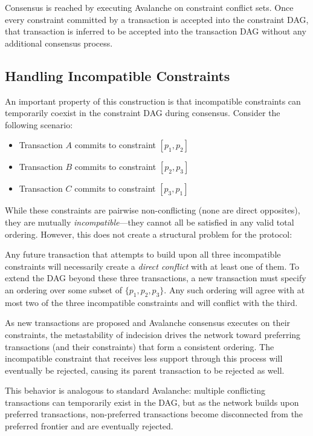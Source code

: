 \documentclass[12pt]{article}
\begin{document}
Consensus is reached by executing Avalanche on constraint conflict sets. Once
every constraint committed by a transaction is accepted into the constraint
DAG, that transaction is inferred to be accepted into the transaction DAG
without any additional consensus process.

\subsection{Handling Incompatible Constraints}
\label{sec:incompatible}
An important property of this construction is that incompatible constraints can
temporarily coexist in the constraint DAG during consensus. Consider the
following scenario:
\begin{itemize}
\item Transaction $A$ commits to constraint $[p_1, p_2]$
\item Transaction $B$ commits to constraint $[p_2, p_3]$
\item Transaction $C$ commits to constraint $[p_3, p_1]$
\end{itemize}

While these constraints are pairwise non-conflicting (none are direct
opposites), they are mutually \emph{incompatible}—they cannot all be satisfied
in any valid total ordering. However, this does not create a structural problem
for the protocol:

Any future transaction that attempts to build upon all three incompatible
constraints will necessarily create a \emph{direct conflict} with at least one
of them. To extend the DAG beyond these three transactions, a new
transaction must specify an ordering over some subset of $\{p_1, p_2, p_3\}$.
Any such ordering will agree with at most two of the three incompatible
constraints and will conflict with the third.

As new transactions are proposed and Avalanche consensus executes on their
constraints, the metastability of indecision drives the network toward
preferring transactions (and their constraints) that form a consistent
ordering. The incompatible constraint that receives less support through this
process will eventually be rejected, causing its parent transaction to be
rejected as well.

This behavior is analogous to standard Avalanche: multiple conflicting
transactions can temporarily exist in the DAG, but as the network builds upon
preferred transactions, non-preferred transactions become disconnected from the
preferred frontier and are eventually rejected.
\end{document}
